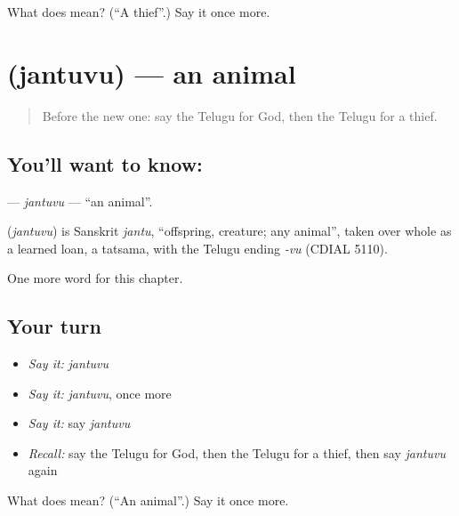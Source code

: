 \begin{tcolorbox}[breakable,colback=teal!4,colframe=teal!35!black,title={Before you move on}]
What does  mean? (\textquotedblleft{}A thief\textquotedblright{}.) Say it once more.
\end{tcolorbox}
\section[\texorpdfstring{\te{జంతువు} (jantuvu)}{జంతువు (jantuvu)}]{ (jantuvu) — an animal}

\label{lesson:TE-C265-jantuvu}



\begin{quote}
Before the new one: say the Telugu for God, then the Telugu for a thief.
\end{quote}

\subsection*{You'll want to know: }
\textbf{} — \emph{jantuvu} — \textquotedblleft{}an animal\textquotedblright{}.

\begin{cousinweb}
\textbf{} (\emph{jantuvu}) is Sanskrit \emph{jantu}, \textquotedblleft{}offspring, creature; any animal\textquotedblright{}, taken over whole as a learned loan, a tatsama, with the Telugu ending \emph{-vu} (CDIAL 5110).
\end{cousinweb}

\begin{grammarlens}[title={What you've built}]
One more word for this chapter.
\end{grammarlens}

\subsection*{Your turn}
\begin{itemize}
\raggedright
  \item \emph{Say it:} \emph{jantuvu}
  \item \emph{Say it:} \emph{jantuvu}, once more
  \item \emph{Say it:} say \emph{jantuvu}
  \item \emph{Recall:} say the Telugu for God, then the Telugu for a thief, then say \emph{jantuvu} again
\end{itemize}

\begin{tcolorbox}[breakable,colback=teal!4,colframe=teal!35!black,title={Before you move on}]
What does  mean? (\textquotedblleft{}An animal\textquotedblright{}.) Say it once more.
\end{tcolorbox}
